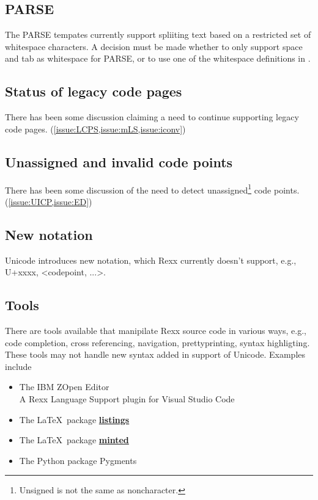 \documentclass[b4paper]{article}
\begin{document}
\subsection{PARSE}
The PARSE tempates currently support spliiting text based on a
restricted set of whitespace characters.  A decision must be made
whether to only support space and tab as whitespace for PARSE, or to
use one of the whitespace definitions in \cite{UAX31}.

\subsection{Status of legacy code pages}
There has been some discussion claiming a need to continue supporting legacy code pages. (\cref{issue:LCPS,issue:mLS,issue:iconv})

\subsection{Unassigned and invalid code points}
There has been some discussion of the need to detect
unassigned\footnote{Unsigned is not the same as noncharacter.}
code points. (\cref{issue:UICP,issue:ED})

\subsection{New notation}
Unicode introduces new notation, which Rexx currently doesn't support, e.g., U+xxxx, <codepoint, ...>.

\subsection{Tools}
There are tools available that manipilate Rexx source code in various
ways, e.g., code completion, cross referencing, navigation, prettyprinting, syntax highligting.
These tools may not handle new syntax added in support of Unicode. Examples include
\begin{itemize}
\item The IBM Z\textregistered Open Editor \\
A Rexx Language Support plugin for Visual Studio Code
\item The \LaTeX\  package \href{https://www.ctan.org/pkg/listings}{\textbf{listings}}
\item The \LaTeX \ package \href{https://www.ctan.org/pkg/minted}{\textbf{minted}}
\item The Python package Pygments
\end{itemize}
\end{document}

